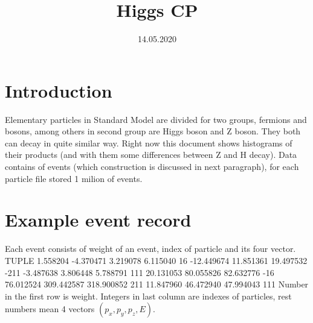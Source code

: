 \documentclass[10pt]{article}
\title{Higgs CP}
\date{14.05.2020}
\begin{document}
\maketitle
\section{Introduction}
Elementary particles in Standard Model are divided for two groups, fermions and bosons, among others in second group are Higgs boson and Z boson. They both can decay in quite similar way. Right now this document shows histograms of their products (and with them some differences between Z and H decay). Data contains of events (which construction is discussed in next paragraph), for each particle file stored 1 milion of events.
\section{Example event record}
Each event consists of weight of an event, index of particle and its four vector. \newline
 TUPLE  1.558204    -4.370471  3.219078  6.115040 16   -12.449674  11.851361  19.497532 -211   -3.487638  3.806448  5.788791 111   20.131053  80.055826  82.632776 -16   76.012524  309.442587  318.900852 211   11.847960  46.472940  47.994043 111 \newline
Number in the first row is weight. Integers in last column are indexes of particles, rest numbers mean 4 vectors $(p_x,p_y,p_z,E)$.
\end{document}
